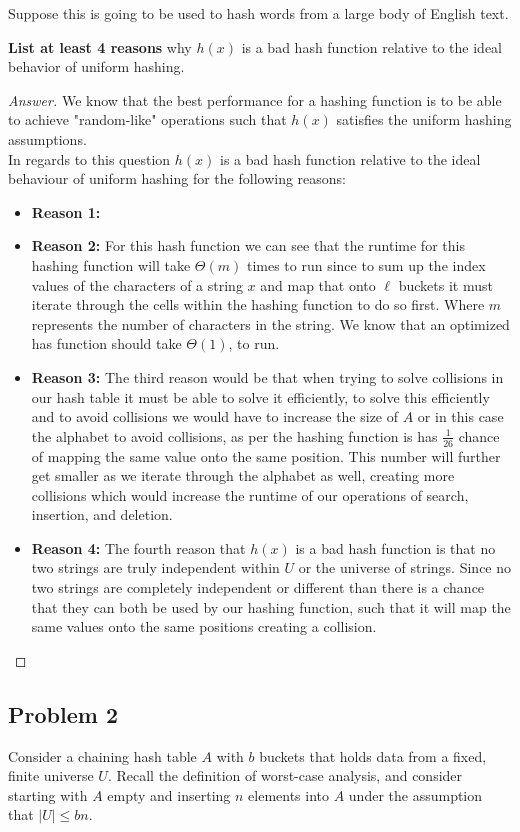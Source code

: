 \documentclass[11pt]{article}
\theoremstyle{definition}
\theoremstyle{definition}
\theoremstyle{definition}
\begin{document}
Suppose this is going to be used to hash words from a large body of English text.
	
\textbf{List at least 4 reasons} why $h(x)$ is a bad hash function relative to the ideal behavior of uniform hashing.

\begin{proof}[Answer]
We know that the best performance for a hashing function is to be able to achieve "random-like" operations such that $h(x)$ satisfies the uniform hashing assumptions. \\

In regards to this question $h(x)$ is a bad hash function relative to the ideal behaviour of uniform hashing for the following reasons: \\
\begin{itemize}
\item \textbf{Reason 1:}
\item \textbf{Reason 2:}
For this hash function we can see that the runtime for this hashing function will take $\Theta(m)$ times to run since to sum up the index values of the characters of a string $x$ and map that onto $\ell$ buckets it must iterate through the cells within the hashing function to do so first. Where $m$ represents the number of characters in the string. We know that an optimized has function should take $\Theta(1)$, to run.
\item \textbf{Reason 3:}
The third reason would be that when trying to solve collisions in our hash table it must be able to solve it efficiently, to solve this efficiently and to avoid collisions we would have to increase the size of $A$ or in this case the alphabet to avoid collisions, as per the hashing function is has $\frac{1}{26}$ chance of mapping the same value onto the same position. This number will further get smaller as we iterate through the alphabet as well, creating more collisions which would increase the runtime of our operations of search, insertion, and deletion. 
\item \textbf{Reason 4:}
The fourth reason that $h(x)$ is a bad hash function is that no two strings are truly independent within $U$ or the universe of strings. Since no two strings are completely independent or different than there is a chance that they can both be used by our hashing function, such that it will map the same values onto the same positions creating a collision.
\end{itemize}
\end{proof}

\newpage
\subsection{Problem 2}
Consider a chaining hash table $A$ with $b$ buckets that holds data from a fixed, finite universe $U$. Recall the definition of worst-case analysis, and consider starting with $A$ empty and inserting $n$ elements into $A$ under the assumption that $|U|\le bn$. 
    
\end{document}
